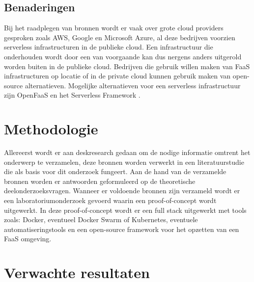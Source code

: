 \subsection{Benaderingen}
Bij het raadplegen van bronnen wordt er vaak over grote cloud providers gesproken zoals AWS, Google en Microsoft Azure, al deze bedrijven voorzien serverless infrastructuren in de publieke cloud. Een infrastructuur die onderhouden wordt door een van voorgaande kan dus nergens anders uitgerold worden buiten in de publieke cloud. Bedrijven die gebruik willen maken van FaaS infrastructuren op locatie of in de private cloud kunnen gebruik maken van open-source alternatieven. Mogelijke alternatieven voor een serverless infrastructuur zijn OpenFaaS \textcite{(Ellis,2017)} en het Serverless Framework \textcite{(Serverless,2018)}.



\section{Methodologie}
\label{sec:methodologie}

Allereerst wordt er aan deskresearch gedaan om de nodige informatie omtrent het onderwerp te verzamelen, deze bronnen worden verwerkt in een literatuurstudie die als basis voor dit onderzoek fungeert. Aan de hand van de verzamelde bronnen worden er antwoorden geformuleerd op de theoretische deelonderzoeksvragen. Wanneer er voldoende bronnen zijn verzameld wordt er een laboratoriumonderzoek gevoerd waarin een proof-of-concept wordt uitgewerkt. In deze proof-of-concept wordt er een full stack uitgewerkt met tools zoals: Docker, eventueel Docker Swarm of Kubernetes, eventuele automatiseringstools en een open-source framework voor het opzetten van een FaaS omgeving.

\section{Verwachte resultaten}
\label{sec:verwachte_resultaten}

